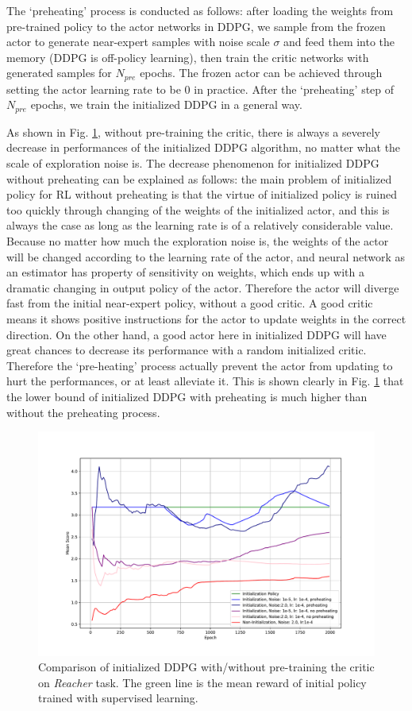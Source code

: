 \documentclass{article}
\begin{document}
The `preheating' process is conducted as follows: after loading the weights from pre-trained policy to the actor networks in DDPG, we sample from the frozen actor to generate near-expert samples with noise scale $\sigma$ and feed them into the memory (DDPG is off-policy learning), then train the critic networks with generated samples for $N_{pre}$ epochs. The frozen actor can be achieved through setting the actor learning rate to be 0 in practice. After the `preheating' step of $N_{pre}$ epochs, we train the initialized DDPG in a general way. 

As shown in Fig. \ref{fig:pretrain}, without pre-training the critic, there is always a severely decrease in performances of the initialized DDPG algorithm, no matter what the scale of exploration noise is. The decrease phenomenon for initialized DDPG without preheating can be explained as follows: the main problem of initialized policy for RL without preheating is that the virtue of initialized policy is ruined too quickly through changing of the weights of the initialized actor, and this is always the case as long as the learning rate is of a relatively considerable value. Because no matter how much the exploration noise is, the weights of the actor will be changed according to the learning rate of the actor, and neural network as an estimator has property of sensitivity on weights, which ends up with a dramatic changing in output policy of the actor. Therefore the actor will diverge fast from the initial near-expert policy, without a good critic. A good critic means it shows positive instructions for the actor to update weights in the correct direction. On the other hand, a good actor here in initialized DDPG will have great chances to decrease its performance with a random initialized critic. Therefore the `pre-heating' process actually prevent the actor from updating to hurt the performances, or at least alleviate it. This is shown clearly in Fig. \ref{fig:pretrain} that the lower bound of initialized DDPG with preheating is much higher than without the preheating process.
\begin{figure}[htbp]
	\centering
	\includegraphics[scale=0.5]{img/ddpg_compare2.pdf}
	\caption{Comparison of initialized DDPG with/without pre-training the critic on \textit{Reacher} task. The green line is the mean reward of initial policy trained with supervised learning.}
	\label{fig:pretrain}
\end{figure}
\end{document}

